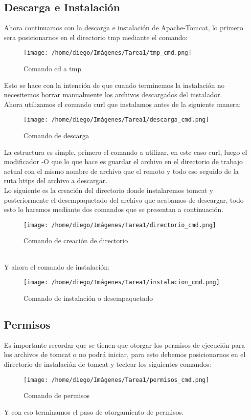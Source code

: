 \documentclass{article}
\begin{document}
		\subsection{Descarga e Instalación}
		Ahora continuamos con la descarga e instalación de Apache-Tomcat, lo primero sera posicionarnos en el directorio tmp mediante el comando:
		\begin{figure}[h]
			\centering
			\texttt{[image: /home/diego/Imágenes/Tarea1/tmp\_cmd.png]}
			\caption{Comando cd a tmp}
		\end{figure}
		Esto se hace con la intención de que cuando terminemos la instalación no necesitemos borrar manualmente los archivos descargados del instalador.\\
		Ahora utilizamos el comando curl que instalamos antes de la siguiente manera:
		\begin{figure}[h]
			\centering
			\texttt{[image: /home/diego/Imágenes/Tarea1/descarga\_cmd.png]}
			\caption{Comando de descarga}
		\end{figure}
		\newpage
		La estructura es simple, primero el comando a utilizar, en este caso curl, luego el modificador -O que lo que hace es guardar el archivo en el directorio de trabajo actual con el mismo nombre de archivo que el remoto y todo eso seguido de la ruta https del archivo a descargar.\\
		Lo siguiente es la creación del directorio donde instalaremos tomcat y posteriormente el desempaquetado del archivo que acabamos de descargar, todo esto lo haremos mediante dos comandos que se presentan a continuación.
		\begin{figure}[h]
			\centering
			\texttt{[image: /home/diego/Imágenes/Tarea1/directorio\_cmd.png]}
			\caption{Comando de creación de directorio}
		\end{figure}
		\\Y ahora el comando de instalación:
		\begin{figure}[h]
			\centering
			\texttt{[image: /home/diego/Imágenes/Tarea1/instalacion\_cmd.png]}
			\caption{Comando de instalación o desempaquetado}
		\end{figure}
		\subsection{Permisos}
		Es importante recordar que se tienen que otorgar los permisos de ejecución para los archivos de tomcat o no podrá iniciar, para esto debemos posicionarnos en el directorio de instalación de tomcat y teclear los siguientes comandos:
		\begin{figure}[h]
			\centering
			\texttt{[image: /home/diego/Imágenes/Tarea1/permisos\_cmd.png]}
			\caption{Comando de permisos}
		\end{figure}
		Y con eso terminamos el paso de otorgamiento de permisos.
		\newpage
\end{document}
